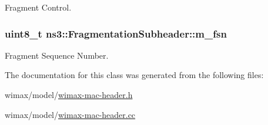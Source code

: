 Fragment Control. 

\subsubsection[{\texorpdfstring{m\+\_\+fsn}{m_fsn}}]{\setlength{\rightskip}{0pt plus 5cm}uint8\+\_\+t ns3\+::\+Fragmentation\+Subheader\+::m\+\_\+fsn\hspace{0.3cm}{\ttfamily [private]}}\hypertarget{classns3_1_1FragmentationSubheader_a18dcedcaa3d5c0b6d8fb816569404b83}{}\label{classns3_1_1FragmentationSubheader_a18dcedcaa3d5c0b6d8fb816569404b83}


Fragment Sequence Number. 



The documentation for this class was generated from the following files\+:\begin{DoxyCompactItemize}
\item 
wimax/model/\hyperlink{wimax-mac-header_8h}{wimax-\/mac-\/header.\+h}\item 
wimax/model/\hyperlink{wimax-mac-header_8cc}{wimax-\/mac-\/header.\+cc}\end{DoxyCompactItemize}
